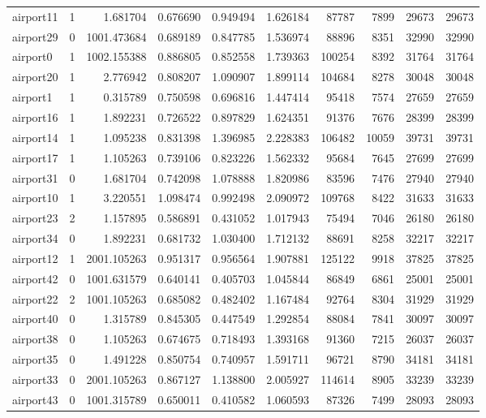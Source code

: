 \begin{longtable}{|l|r|r|r|r|r|r|r|r|r|}
airport11 & 1 & 1.681704 & 0.676690 & 0.949494 & 1.626184 & 87787 & 7899 & 29673 & 29673 \\
airport29 & 0 & 1001.473684 & 0.689189 & 0.847785 & 1.536974 & 88896 & 8351 & 32990 & 32990 \\
airport0 & 1 & 1002.155388 & 0.886805 & 0.852558 & 1.739363 & 100254 & 8392 & 31764 & 31764 \\
airport20 & 1 & 2.776942 & 0.808207 & 1.090907 & 1.899114 & 104684 & 8278 & 30048 & 30048 \\
airport1 & 1 & 0.315789 & 0.750598 & 0.696816 & 1.447414 & 95418 & 7574 & 27659 & 27659 \\
airport16 & 1 & 1.892231 & 0.726522 & 0.897829 & 1.624351 & 91376 & 7676 & 28399 & 28399 \\
airport14 & 1 & 1.095238 & 0.831398 & 1.396985 & 2.228383 & 106482 & 10059 & 39731 & 39731 \\
airport17 & 1 & 1.105263 & 0.739106 & 0.823226 & 1.562332 & 95684 & 7645 & 27699 & 27699 \\
airport31 & 0 & 1.681704 & 0.742098 & 1.078888 & 1.820986 & 83596 & 7476 & 27940 & 27940 \\
airport10 & 1 & 3.220551 & 1.098474 & 0.992498 & 2.090972 & 109768 & 8422 & 31633 & 31633 \\
airport23 & 2 & 1.157895 & 0.586891 & 0.431052 & 1.017943 & 75494 & 7046 & 26180 & 26180 \\
airport34 & 0 & 1.892231 & 0.681732 & 1.030400 & 1.712132 & 88691 & 8258 & 32217 & 32217 \\
airport12 & 1 & 2001.105263 & 0.951317 & 0.956564 & 1.907881 & 125122 & 9918 & 37825 & 37825 \\
airport42 & 0 & 1001.631579 & 0.640141 & 0.405703 & 1.045844 & 86849 & 6861 & 25001 & 25001 \\
airport22 & 2 & 1001.105263 & 0.685082 & 0.482402 & 1.167484 & 92764 & 8304 & 31929 & 31929 \\
airport40 & 0 & 1.315789 & 0.845305 & 0.447549 & 1.292854 & 88084 & 7841 & 30097 & 30097 \\
airport38 & 0 & 1.105263 & 0.674675 & 0.718493 & 1.393168 & 91360 & 7215 & 26037 & 26037 \\
airport35 & 0 & 1.491228 & 0.850754 & 0.740957 & 1.591711 & 96721 & 8790 & 34181 & 34181 \\
airport33 & 0 & 2001.105263 & 0.867127 & 1.138800 & 2.005927 & 114614 & 8905 & 33239 & 33239 \\
airport43 & 0 & 1001.315789 & 0.650011 & 0.410582 & 1.060593 & 87326 & 7499 & 28093 & 28093 \\

\end{longtable}
